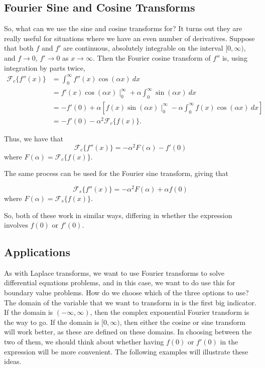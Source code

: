 \subsection{Fourier Sine and Cosine Transforms}

So, what can we use the sine and cosine transforms for? It turns out they are really useful for situations where we have an even number of derivatives. Suppose that both $f$ and $f'$ are continuous, absolutely integrable on the interval $[0, \infty)$, and $f \rightarrow 0$, $f' \rightarrow 0$ as $x \rightarrow \infty$. Then the Fourier cosine transform of $f''$ is, using integration by parts twice, 
\[ 
\begin{split}
\mathcal{F}_c\{f''(x)\} &= \int_0^\infty f''(x) \cos(\alpha x)\ dx \\
&= f'(x)\cos(\alpha x) \mid_0^\infty + \alpha \int_0^\infty \sin(\alpha x)\ dx \\
&= -f'(0) + \alpha \left[ f(x) \sin(\alpha x) \mid_0^\infty - \alpha \int_0^\infty f(x) \cos(\alpha x)\ dx \right] \\
&= -f'(0) - \alpha^2 \mathcal{F}_c\{f(x)\}.
\end{split}
\]

Thus, we have that
\[ \mathcal{F}_c\{f''(x)\} = -\alpha^2 F(\alpha) - f'(0) \] where $F(\alpha) = \mathcal{F}_c\{f(x)\}$. 

The same process can be used for the Fourier sine transform, giving that 

\[ \mathcal{F}_s\{f''(x)\} = -\alpha^2 F(\alpha) + \alpha f(0) \] where $F(\alpha) = \mathcal{F}_s\{f(x)\}$. 

So, both of these work in similar ways, differing in whether the expression involves $f(0)$ or $f'(0)$.

\subsection{Applications}

As with Laplace transforms, we want to use Fourier transforms to solve differential equations problems, and in this case, we want to do use this for boundary value problems. How do we choose which of the three options to use? The domain of the variable that we want to transform in is the first big indicator. If the domain is $(-\infty, \infty)$, then the complex exponential Fourier transform is the way to go. If the domain is $[0, \infty)$, then either the cosine or sine transform will work better, as these are defined on these domains. In choosing between the two of them, we should think about whether having $f(0)$ or $f'(0)$ in the expression will be more convenient. The following examples will illustrate these ideas. 

